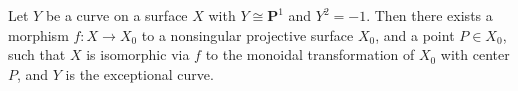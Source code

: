 Let $Y$ be a curve on a surface $X$ with $Y \cong \mathbf{P}^1$ and $Y^2 = -1$. Then there exists a morphism $f: X \to X_0$ to a nonsingular projective surface $X_0$, and a point $P \in X_0$, such that $X$ is isomorphic via $f$ to the monoidal transformation of $X_0$ with center $P$, and $Y$ is the exceptional curve.
